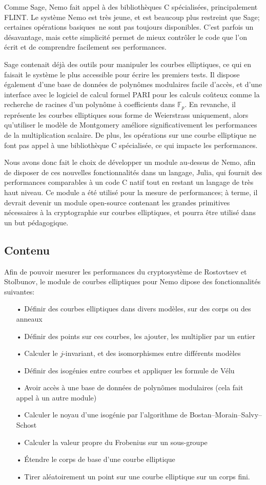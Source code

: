 \documentclass[11pt,a4paper]{article}
\newcommand{\F}{\mathbb{F}}
\renewcommand{\v}{\vspace{5mm}}
\theoremstyle{definition}
\begin{document}
Comme Sage, Nemo fait appel à des bibliothèques C spécialisées, principalement FLINT. Le système Nemo est très jeune, et est beaucoup plus restreint que Sage; certaines opérations \og basiques\fg\ ne sont pas toujours disponibles. C'est parfois un désavantage, mais cette simplicité permet de mieux contrôler le code que l'on écrit et de comprendre facilement ses performances.

\v
Sage contenait déjà des outils pour manipuler les courbes elliptiques, ce qui en faisait le système le plus accessible pour écrire les premiers tests. Il dispose également d'une base de données de polynômes modulaires facile d'accès, et d'une interface avec le logiciel de calcul formel PARI pour les calculs coûteux comme la recherche de racines d'un polynôme à coefficients dans $\F_p$. En revanche, il représente les courbes elliptiques sous forme de Weierstrass uniquement, alors qu'utiliser le modèle de Montgomery améliore significativement les performances de la multiplication scalaire. De plus, les opérations sur une courbe elliptique ne font pas appel à une bibliothèque C spécialisée, ce qui impacte les performances. 

Nous avons donc fait le choix de développer un module au-dessus de Nemo, afin de disposer de ces nouvelles fonctionnalités dans un langage, Julia, qui fournit des performances comparables à un code C natif tout en restant un langage de très haut niveau. Ce module a été utilisé pour la mesure de performances; à terme, il devrait devenir un module open-source contenant les grandes primitives nécessaires à la cryptographie sur courbes elliptiques, et pourra être utilisé dans un but pédagogique.


\subsection{Contenu}

Afin de pouvoir mesurer les performances du cryptosystème de Rostovtsev et Stolbunov, le module de courbes elliptiques pour Nemo dipose des fonctionnalités suivantes:
\begin{itemize}
\item[•] Définir des courbes elliptiques dans divers modèles, sur des corps ou des anneaux
\item[•] Définir des points sur ces courbes, les ajouter, les multiplier par un entier
\item[•] Calculer le $j$-invariant, et des isomorphismes entre différents modèles
\item[•] Définir des isogénies entre courbes et appliquer les formule de Vélu
\item[•] Avoir accès à une base de données de polynômes modulaires (cela fait appel à un autre module)
\item[•] Calculer le noyau d'une isogénie par l'algorithme de Bostan--Morain--Salvy--Schost
\item[•] Calculer la valeur propre du Frobenius sur un sous-groupe
\item[•] Étendre le corps de base d'une courbe elliptique
\item[•] Tirer aléatoirement un point sur une courbe elliptique sur un corps fini.
\end{itemize}
\end{document}
